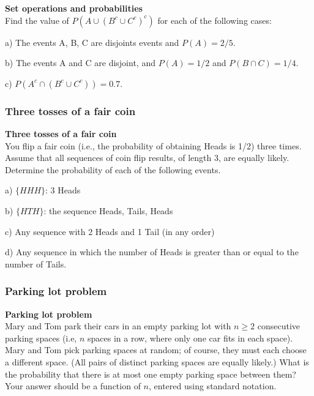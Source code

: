 \documentclass[pdftex, brazil, 12pt, twoside]{article}
\begin{document}
\begin{exercise}
  \textbf{Set operations and probabilities}\\
  Find the value of $P(A \cup (B^c \cup C^c)^c)$ for each of the following cases:

  a) The events A, B, C are disjoints events and $P(A) = 2/5$.

  b) The events A and C are disjoint, and $P(A)=1/2$ and $P(B \cap C)=1/4$.

  c) $P(A^c \cap (B^c \cup C^c))=0.7$.
\end{exercise}

\subsubsection{Three tosses of a fair coin}
\label{un1-ps1-coin}

\begin{exercise}
  \textbf{Three tosses of a fair coin}\\
  You flip a fair coin (i.e., the probability of obtaining Heads is 1/2) three times.
  Assume that all sequences of coin flip results, of length 3, are equally likely.
  Determine the probability of each of the following events.

  a) $\{H H H\}$: 3 Heads

  b) $\{H T H\}$: the sequence Heads, Tails, Heads

  c) Any sequence with 2 Heads and 1 Tail (in any order)

  d) Any sequence in which the number of Heads is greater than or equal to the number of Tails.
\end{exercise}

\subsubsection{Parking lot problem}
\label{un1-ps1-parking-lot}

\begin{exercise}
  \textbf{Parking lot problem}\\
  Mary and Tom park their cars in an empty parking lot with $n \ge 2$ consecutive
  parking spaces (i.e, $n$ spaces in a row, where only one car fits in each space).
  Mary and Tom pick parking spaces at random; of course, they must each choose a
  different space. (All pairs of distinct parking spaces are equally likely.)
  What is the probability that there is at most one empty parking space between them?
  Your answer should be a function of $n$, entered using standard notation.
\end{exercise}
\end{document}
